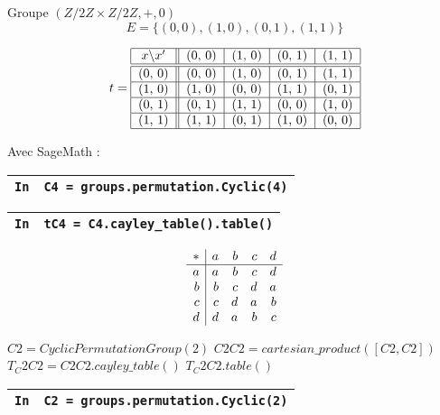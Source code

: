\documentclass[titlepage]{article}
\begin{document}
        Groupe $(Z/2Z \times Z/2Z, +, 0)$
        \[E = \{(0, 0), (1, 0), (0, 1), (1, 1)\}\]
  
        \[t=\begin{tabular}{| c || c | c | c | c |}
            \hline
            $x$\textbackslash $x'$ & (0, 0) & (1, 0) & (0, 1) & (1, 1) \\ \hline \hline
            (0, 0) & (0, 0) & (1, 0) & (0, 1) & (1, 1) \\ \hline
            (1, 0) & (1, 0) & (0, 0) & (1, 1) & (0, 1) \\ \hline
            (0, 1) & (0, 1) & (1, 1) & (0, 0) & (1, 0) \\ \hline
            (1, 1) & (1, 1) & (0, 1) & (1, 0) & (0, 0) \\
            \hline
        \end{tabular}\]

        Avec SageMath :

        \begin{tabularx}{11.5cm}{|p{0.60cm}|X|}
            \hline
            \verb|In|
            & 
            \verb|C4 = groups.permutation.Cyclic(4)|
            \\
            \hline
        \end{tabularx}
            
        \begin{tabularx}{11.5cm}{|p{0.60cm}|X|}
            \hline
            \verb|In|
            & 
            \verb|tC4 = C4.cayley_table().table()|
            \\
            \hline
        \end{tabularx}

        {\setlength{\arraycolsep}{2ex}
        \[\begin{array}{r|*{4}{r}}
            \multicolumn{1}{c|}{\ast}&a&b&c&d\\\hline
            {}a&a&b&c&d\\
            {}b&b&c&d&a\\
            {}c&c&d&a&b\\
            {}d&d&a&b&c\\
        \end{array}\]}

        $C2 = CyclicPermutationGroup(2)$
        $C2C2 = cartesian\_product([C2, C2])$
        $T_C2C2 = C2C2.cayley\_table()$
        $T_C2C2.table()$
        \begin{tabularx}{11.5cm}{|p{0.60cm}|X|}
            \hline
            \verb|In|
            & 
            \verb|C2 = groups.permutation.Cyclic(2)|
            \\
            \hline
        \end{tabularx}
\end{document}
